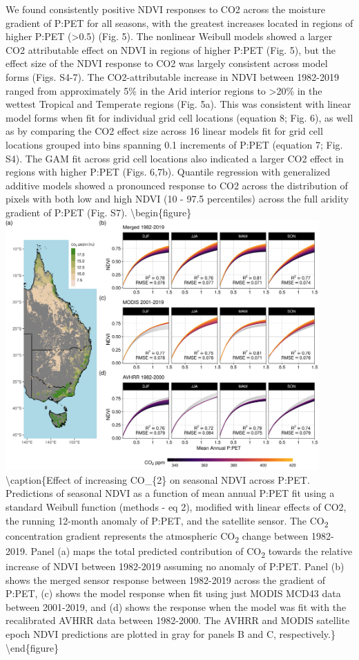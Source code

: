 \documentclass[gc, manuscript]{copernicus}
\begin{document}
We found consistently positive NDVI responses to CO2 across the moisture
gradient of P:PET for all seasons, with the greatest increases located
in regions of higher P:PET (\textgreater0.5) (Fig. 5). The nonlinear
Weibull models showed a larger CO2 attributable effect on NDVI in
regions of higher P:PET (Fig. 5), but the effect size of the NDVI
response to CO2 was largely consistent across model forms (Figs. S4-7).
The CO2-attributable increase in NDVI between 1982-2019 ranged from
approximately 5\% in the Arid interior regions to \textgreater20\% in
the wettest Tropical and Temperate regions (Fig. 5a). This was
consistent with linear model forms when fit for individual grid cell
locations (equation 8; Fig. 6), as well as by comparing the CO2 effect
size across 16 linear models fit for grid cell locations grouped into
bins spanning 0.1 increments of P:PET (equation 7; Fig. S4). The GAM fit
across grid cell locations also indicated a larger CO2 effect in regions
with higher P:PET (Figs. 6,7b). Quantile regression with generalized
additive models showed a pronounced response to CO2 across the
distribution of pixels with both low and high NDVI (10 - 97.5
percentiles) across the full aridity gradient of P:PET (Fig. S7).
\textbackslash begin\{figure\}
\includegraphics[width=12cm]{../../figures/Fig5_n4_ndvi_map_weibull_ppet_x_co2_modeled_effect}
\textbackslash caption\{Effect of increasing CO\_\{2\} on seasonal NDVI
across P:PET. Predictions of seasonal NDVI as a function of mean annual
P:PET fit using a standard Weibull function (methods - eq 2), modified
with linear effects of CO2, the running 12-month anomaly of P:PET, and
the satellite sensor. The CO\textsubscript{2} concentration gradient
represents the atmospheric CO\textsubscript{2} change between 1982-2019.
Panel (a) maps the total predicted contribution of CO\textsubscript{2}
towards the relative increase of NDVI between 1982-2019 assuming no
anomaly of P:PET. Panel (b) shows the merged sensor response between
1982-2019 across the gradient of P:PET, (c) shows the model response
when fit using just MODIS MCD43 data between 2001-2019, and (d) shows
the response when the model was fit with the recalibrated AVHRR data
between 1982-2000. The AVHRR and MODIS satellite epoch NDVI predictions
are plotted in gray for panels B and C,
respectively.\}\label{fig:unnamed-chunk-4} \textbackslash end\{figure\}
\end{document}

